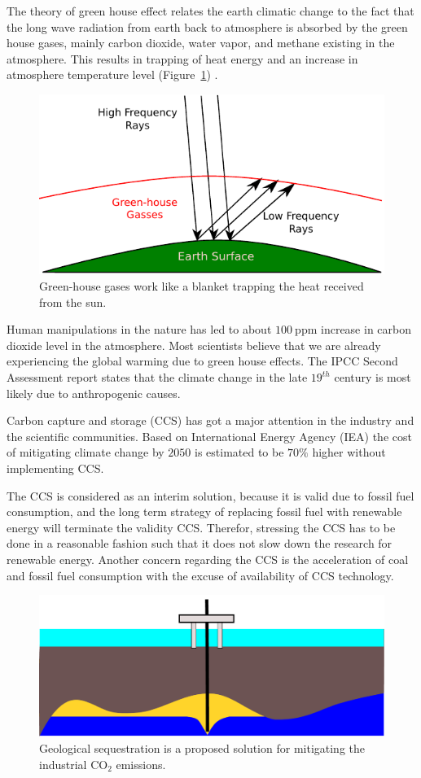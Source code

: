 The theory of green house effect relates the earth climatic change to the fact that the long wave radiation from earth back to atmosphere is absorbed by the green house gases, mainly carbon dioxide, water vapor, and methane existing in the atmosphere. This results in trapping of heat energy and an increase in atmosphere temperature level (Figure~\ref{fig:grHsGs}) \cite{foukal2006variations}.

\begin{figure}
  \centering
  \includegraphics[width=0.65 \linewidth]{./figurer/G-H_gasses} 
  \caption{Green-house gases work like a blanket trapping the heat received from the sun.}
  \label{fig:grHsGs}
%
\end{figure}

Human manipulations in the nature has led to about $100~\mbox{ppm}$ increase in carbon dioxide level in the atmosphere. Most scientists believe that we are already experiencing the global warming due to green house effects. The IPCC Second Assessment report states that the climate change in the late $19^{th}$ century is most likely due to anthropogenic causes. 

Carbon capture and storage (CCS) has got a major attention in the industry and the scientific communities. Based on International Energy Agency (IEA) the cost of mitigating climate change by $2050$ is estimated to be $70\%$ higher without implementing CCS.

The CCS is considered as an interim solution, because it is valid due to fossil fuel consumption, and the long term strategy of replacing fossil fuel with renewable energy will terminate the validity CCS. Therefor, stressing the CCS has to be done in a reasonable fashion such that it does not slow down the research for renewable energy. Another concern regarding the CCS is the acceleration of coal and fossil fuel consumption with the excuse of availability of CCS technology.

\begin{figure}
  \centering
  \includegraphics[width=0.65 \linewidth]{./figurer/platform} 
  \caption{Geological sequestration is a proposed solution for mitigating the industrial $\mbox{CO}_2$ emissions.}
  \label{fig:platform}
%
\end{figure}


